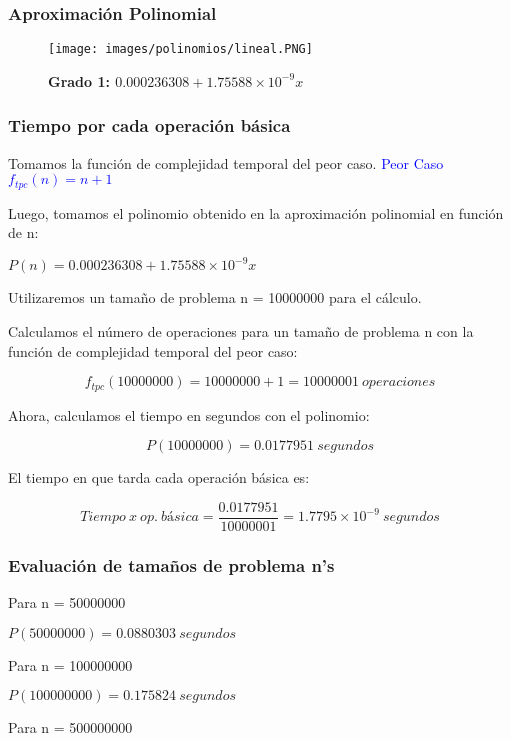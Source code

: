 \documentclass[12pt]{article}
\begin{document}
        	\subsubsection{Aproximación Polinomial}
        	\begin{figure}[H]
    			  \centering
    			 \texttt{[image: images/polinomios/lineal.PNG]}
    			    	   \caption*{\textbf{Grado 1: $0.000236308 + 1.75588\times10^{-9} x$}}
    			  \end{figure}

        	\subsubsection{Tiempo por cada operación básica}
        	Tomamos la función de complejidad temporal del peor caso. \textcolor{blue}{ Peor Caso $f_{tpc}(n) = n+1$}
    			
    			Luego, tomamos el polinomio obtenido en la aproximación polinomial en función de n: 
    			
    			$P(n) = 0.000236308 + 1.75588\times10^{-9} x$
    			
    			Utilizaremos un tamaño de problema n = 10000000 para el cálculo.
    			
    			Calculamos el número de operaciones para un tamaño de problema n con la función de complejidad temporal del peor caso:
    			
    			$$f_{tpc}(10000000) = 10000000+1 = 10000001~operaciones$$
    			
    			Ahora, calculamos el tiempo en segundos con el polinomio:
    			
    			$$P(10000000) = 0.0177951~segundos$$
    			
    			El tiempo en que tarda cada operación básica es:
    			
    			$$Tiempo~x~op.~básica = \frac{0.0177951}{10000001} =1.7795\times10^{-9}~segundos$$
    
        	\subsubsection{Evaluación de tamaños de problema n's}
        	Para n = 50000000
    			
                $P(50000000) = 0.0880303~ segundos$
    
    			Para n = 100000000
    			
    			$P(100000000) = 0.175824~ segundos$
    			
    			Para n = 500000000
    			
\end{document}
